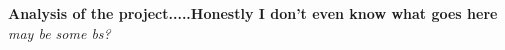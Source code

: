 \textbf{Analysis of the project.....Honestly I don't even know what goes here} \textit{may be some bs?} 

